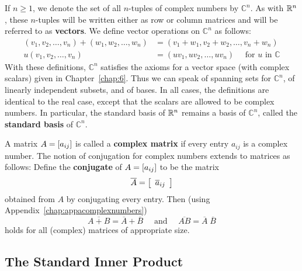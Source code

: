 If $n \geq 1$, we denote the set of all $n$-tuples of complex numbers by $\mathbb{C}^n$. As with $\mathbb{R}^n$, these $n$-tuples will be written either as row or column matrices and will be referred to as \textbf{vectors}. We define vector operations on $\mathbb{C}^n$ as follows:
\begin{align*}
(v_{1},  v_{2}, \dots, v_{n}) + (w_{1}, w_{2}, \dots, w_{n}) &= (v_{1} + w_{1}, v_{2} + w_{2}, \dots, v_{n} + w_{n}) \\
u(v_{1}, v_{2}, \dots, v_{n}) &= (uv_{1}, uv_{2}, \dots, uv_{n}) \quad \mbox{ for } u \mbox{ in } \mathbb{C}
\end{align*}
With these definitions, $\mathbb{C}^n$ satisfies the axioms for a vector space (with complex scalars) given in Chapter~\ref{chap:6}. Thus we can speak of spanning sets for $\mathbb{C}^n$, of linearly independent subsets, and of bases. In all cases, the definitions are identical to the real case, except that the scalars are allowed to be complex numbers. In particular, the standard basis of $\mathbb{R}^n$ remains a basis of $\mathbb{C}^n$, called the \textbf{standard basis} of $\mathbb{C}^n$.

A matrix $A = \left[ a_{ij} \right]$ is called a \textbf{complex matrix} if every entry $a_{ij}$ is a complex number. The notion of conjugation for complex numbers extends to matrices as follows: Define the \textbf{conjugate} of $A = \left[ a_{ij} \right]$ to be the matrix
\begin{equation*}
\overline{A} = \left[ \begin{array}{c} \overline{a}_{ij} \end{array}\right]
\end{equation*}
obtained from $A$ by conjugating every entry. Then (using Appendix~\ref{chap:appacomplexnumbers})
\begin{equation*}
\overline{A + B} = \overline{A} + \overline{B} \quad \mbox{ and } \quad \overline{AB} = \overline{A} \; \overline{B}
\end{equation*}
holds for all (complex) matrices of appropriate size.


\subsection*{The Standard Inner Product}

